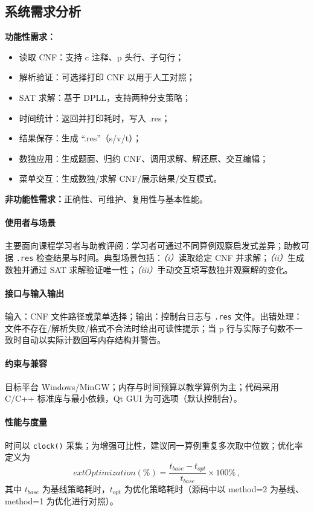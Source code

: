 \documentclass[UTF8]{ctexart}
\begin{document}
\subsection{系统需求分析}
\textbf{功能性需求：}
\begin{itemize}
  \item 读取 CNF：支持 c 注释、p 头行、子句行；
  \item 解析验证：可选择打印 CNF 以用于人工对照；
  \item SAT 求解：基于 DPLL，支持两种分支策略；
  \item 时间统计：返回并打印耗时，写入 .res；
  \item 结果保存：生成 ``.res''（s/v/t）；
  \item 数独应用：生成题面、归约 CNF、调用求解、解还原、交互编辑；
  \item 菜单交互：生成数独/求解 CNF/展示结果/交互模式。
\end{itemize}
\textbf{非功能性需求：}正确性、可维护、复用性与基本性能。

\paragraph{使用者与场景} 主要面向课程学习者与助教评阅：学习者可通过不同算例观察启发式差异；助教可据 \texttt{.res} 检查结果与时间。典型场景包括：\emph{（i）}读取给定 CNF 并求解；\emph{（ii）}生成数独并通过 SAT 求解验证唯一性；\emph{（iii）}手动交互填写数独并观察解的变化。

\paragraph{接口与输入输出} 输入：CNF 文件路径或菜单选择；输出：控制台日志与 \texttt{.res} 文件。出错处理：文件不存在/解析失败/格式不合法时给出可读性提示；当 p 行与实际子句数不一致时自动以实际计数回写内存结构并警告。

\paragraph{约束与兼容} 目标平台 Windows/MinGW；内存与时间预算以教学算例为主；代码采用 C/C++ 标准库与最小依赖，Qt GUI 为可选项（默认控制台）。

\paragraph{性能与度量} 时间以 \texttt{clock()} 采集；为增强可比性，建议同一算例重复多次取中位数；优化率定义为
\[
  	ext{Optimization}(\%) = \frac{t_{base} - t_{opt}}{t_{base}} \times 100\% \, ,
\]
其中 \(t_{base}\) 为基线策略耗时，\(t_{opt}\) 为优化策略耗时（源码中以 method=2 为基线、method=1 为优化进行对照）。
\end{document}
